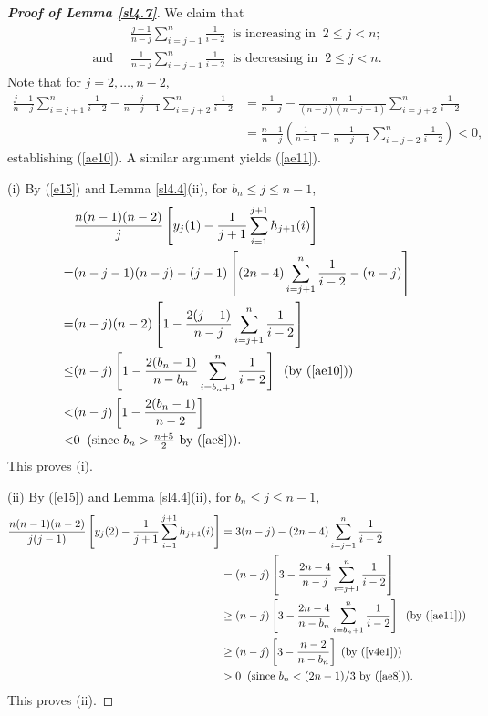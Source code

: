 \documentclass[12pt, A4paper, oneside]{article}
\theoremstyle{plain}
\numberwithin{equation}{section}
\begin{document}
\begin{proof}[\bf Proof of Lemma \ref{sl4.7}]
We claim that
\begin{align}
&\frac{j-1}{n-j}\sum_{i=j+1}^{n}\frac{1}{i-2}\;\;\mbox{is increasing in}\;\;2\le j<n;\label{ae10}\\
\mbox{and}\;\;&\frac{1}{n-j}\sum_{i=j+1}^{n}\frac{1}{i-2}\;\;\mbox{is decreasing in}\;\;2\le j<n.\label{ae11}
\end{align}
Note that for $j=2,\dots, n-2$,
\begin{align*}
\frac{j-1}{n-j}\sum_{i=j+1}^{n}\frac{1}{i-2}-\frac{j}{n-j-1}\sum_{i=j+2}^{n}\frac{1}{i-2}&=\frac{1}{n-j}-\frac{n-1}{(n-j)(n-j-1)}\sum_{i=j+2}^{n}\frac{1}{i-2}\\
&=\frac{n-1}{n-j}\left(\frac{1}{n-1}-\frac{1}{n-j-1}\sum_{i=j+2}^{n}\frac{1}{i-2}\right)<0,
\end{align*}
establishing  (\ref{ae10}). A similar argument yields (\ref{ae11}).


(i) By (\ref{e15}) and Lemma \ref{sl4.4}(ii), for $b_n\le j\le n-1$,
\begin{align*}
&\frac{n(n-1)(n-2)}{j}\left[y_j(1)-\frac{1}{j+1}\sum_{i=1}^{j+1}h_{j+1}(i)\right]\\
=&(n-j-1)(n-j)-(j-1)\left[(2n-4)\sum_{i=j+1}^{n}\frac{1}{i-2}-(n-j)\right]\\
=&(n-j)(n-2)\left[1-\frac{2(j-1)}{n-j}\sum_{i=j+1}^{n}\frac{1}{i-2}\right]\\
\le&(n-j)\left[1-\frac{2(b_n-1)}{n-b_n}\sum_{i=b_n+1}^{n}\frac{1}{i-2}\right]\;\;\mbox{(by (\ref{ae10}))}\\
<&(n-j)\left[1-\frac{2(b_n-1)}{n-2}\right]\\
<&0\;\;\mbox{(since $b_n>\frac{n+5}{2}$ by (\ref{ae8}))}.
\end{align*}
This proves (i).

(ii) By (\ref{e15}) and Lemma \ref{sl4.4}(ii), for $b_n\le j\le n-1$,
\begin{align*}
\frac{n(n-1)(n-2)}{j(j-1)}\left[y_j(2)-\frac{1}{j+1}\sum_{i=1}^{j+1}h_{j+1}(i)\right]&=3(n-j)-(2n-4)\sum_{i=j+1}^{n}\frac{1}{i-2}\\
&=(n-j)\left[3-\frac{2n-4}{n-j}\sum_{i=j+1}^{n}\frac{1}{i-2}\right]\\
&\ge(n-j)\left[3-\frac{2n-4}{n-b_n}\sum_{i=b_n+1}^{n}\frac{1}{i-2}\right]\;\;\mbox{(by (\ref{ae11}))}\\
&\ge(n-j)\left[3-\frac{n-2}{n-b_n}\right]\;\mbox{(by (\ref{v4e1}))}\\
&>0\;\;\mbox{(since $b_n<(2n-1)/3$ by (\ref{ae8}))}.
\end{align*}
This proves (ii).


\end{proof}
\end{document}

